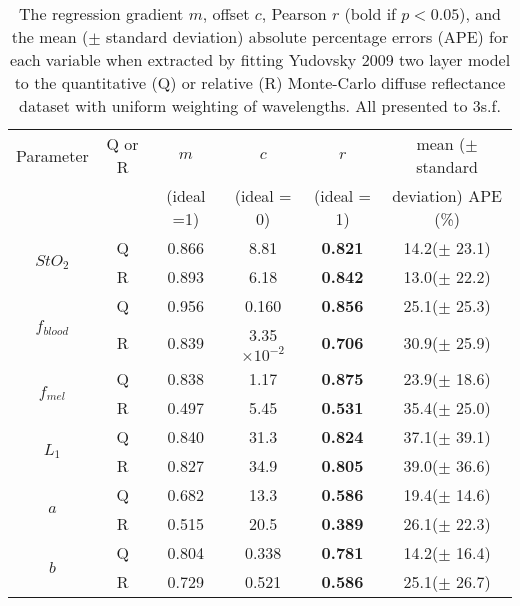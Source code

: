 \begin{subappendices}
\begin{table}[h]
    \centering
    \caption{The regression gradient $m$, offset $c$, Pearson $r$ (bold if $p<0.05$), and the mean ($\pm$ standard deviation) absolute percentage errors (APE) for each variable when extracted by fitting Yudovsky 2009 two layer model to the quantitative (Q) or relative (R) Monte-Carlo diffuse reflectance dataset with uniform weighting of wavelengths. All presented to 3s.f.}
    \begin{tabular}{|c|c|cccc|}
        \hline
        Parameter & Q or R & $m$ & $c$ & $r$ & mean ($\pm$ standard  \\
        &  & (ideal =1) & (ideal = 0) & (ideal = 1) & deviation) APE (\%)\\
        \hline
        \multirow{2}{*}{$StO_2$} & Q & 0.866 & 8.81 & \textbf{0.821} & 14.2($\pm$ 23.1) \\
        & R & 0.893 & 6.18 & \textbf{0.842} & 13.0($\pm$ 22.2) \\
        \hline
        \multirow{2}{*}{$f_{blood}$} & Q & 0.956 & 0.160 & \textbf{0.856} & 25.1($\pm$ 25.3) \\
        & R & 0.839 & 3.35$\times 10^{-2}$ & \textbf{0.706} & 30.9($\pm$ 25.9) \\
        \hline
        \multirow{2}{*}{$f_{mel}$} & Q & 0.838 & 1.17 & \textbf{0.875} & 23.9($\pm$ 18.6) \\
        & R & 0.497 & 5.45 & \textbf{0.531} & 35.4($\pm$ 25.0) \\
        \hline
        \multirow{2}{*}{$L_1$} & Q & 0.840 & 31.3 & \textbf{0.824} & 37.1($\pm$ 39.1) \\
         & R & 0.827 & 34.9 & \textbf{0.805} & 39.0($\pm$ 36.6) \\
        \hline
        \multirow{2}{*}{$a$} & Q & 0.682 & 13.3 & \textbf{0.586} & 19.4($\pm$ 14.6) \\
        & R & 0.515 & 20.5 & \textbf{0.389} & 26.1($\pm$ 22.3) \\
        \hline
        \multirow{2}{*}{$b$} & Q & 0.804 & 0.338 & \textbf{0.781} & 14.2($\pm$ 16.4) \\
        & R & 0.729 & 0.521 & \textbf{0.586} & 25.1($\pm$ 26.7) \\
        \hline
    \end{tabular}
    \label{tb:doubleparamtrendsuniform}
\end{table}
\FloatBarrier


\end{subappendices}
